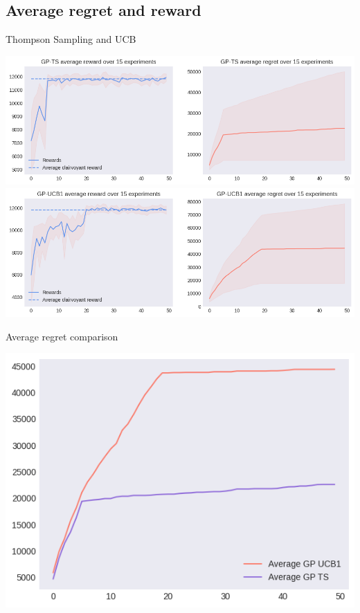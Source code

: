 \subsection{Average regret and reward}

Thompson Sampling and UCB

\begin{center}
	\includegraphics[scale=0.5]{img/Graphs/uncertain_alpha/image4.png}
	\includegraphics[scale=0.5]{img/Graphs/uncertain_alpha/image5.png}
\end{center}

Average regret comparison

\begin{center}
	\includegraphics[scale=0.5]{img/Graphs/uncertain_alpha/image6.png}
\end{center}

